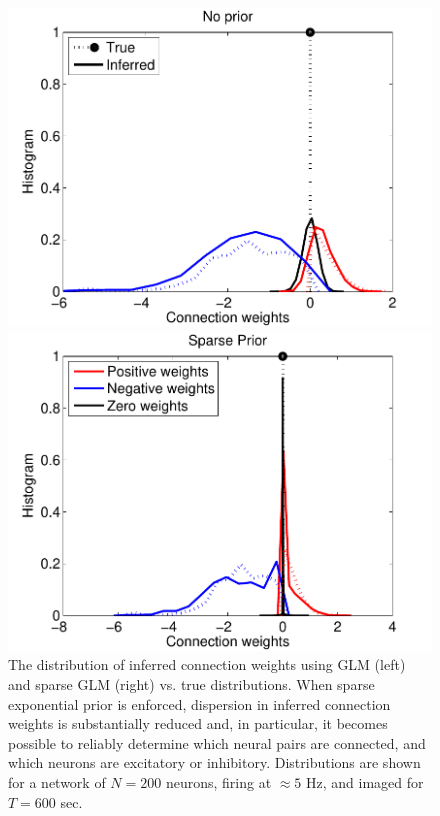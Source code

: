 \begin{figure}[h]
\centering
\begin{minipage}[c]{0.45\hsize}
\includegraphics[width=\hsize]{../figs/FigureA3_hist_glm200}
\end{minipage}
\begin{minipage}[c]{0.45\hsize}
\includegraphics[width=\hsize]{../figs/FigureA3_hist_spa200}
\end{minipage}
\caption{
The distribution of inferred connection weights using GLM (left) and sparse GLM (right) vs. true distributions. When sparse exponential prior is enforced, dispersion in inferred connection weights is substantially reduced and, in particular, it becomes possible to reliably determine which neural pairs are connected, and which neurons are excitatory or inhibitory. Distributions are shown for a network of $N=200$ neurons, firing at $\approx 5$ Hz, and imaged for $T=600$ sec.}
\label{fig:distros}
\end{figure}


